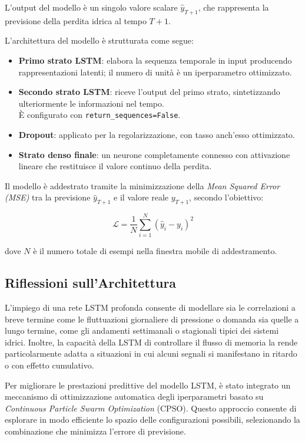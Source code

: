 \documentclass{article}
\begin{document}
L'output del modello è un singolo valore scalare $\hat{y}_{T+1}$, che rappresenta la previsione della perdita idrica al tempo $T+1$.

L’architettura del modello è strutturata come segue:

\begin{itemize}
    \item \textbf{Primo strato LSTM}: elabora la sequenza temporale in input producendo rappresentazioni latenti; il numero di unità è un iperparametro ottimizzato.
    \item \textbf{Secondo strato LSTM}: riceve l'output del primo strato, sintetizzando ulteriormente le informazioni nel tempo. \\È configurato con \verb|return_sequences=False|.
    \item \textbf{Dropout}: applicato per la regolarizzazione, con tasso anch'esso ottimizzato.
    \item \textbf{Strato denso finale}: un neurone completamente connesso con attivazione lineare che restituisce il valore continuo della perdita.
\end{itemize}

Il modello è addestrato tramite la minimizzazione della \textit{Mean Squared Error (MSE)} tra la previsione $\hat{y}_{T+1}$ e il valore reale $y_{T+1}$, secondo l’obiettivo:

\begin{equation}
\mathcal{L} = \frac{1}{N} \sum_{i=1}^N \left( \hat{y}_{i} - y_{i} \right)^2
\end{equation}

dove $N$ è il numero totale di esempi nella finestra mobile di addestramento.

\subsection{Riflessioni sull’Architettura}

L’impiego di una rete LSTM profonda consente di modellare sia le correlazioni a breve termine come le fluttuazioni giornaliere di pressione o domanda sia quelle a lungo termine, come gli andamenti settimanali o stagionali tipici dei sistemi idrici. Inoltre, la capacità della LSTM di controllare il flusso di memoria la rende particolarmente adatta a situazioni in cui alcuni segnali si manifestano in ritardo o con effetto cumulativo.

Per migliorare le prestazioni predittive del modello LSTM, è stato integrato un meccanismo di ottimizzazione automatica degli iperparametri basato su \textit{Continuous Particle Swarm Optimization} (CPSO). Questo approccio consente di esplorare in modo efficiente lo spazio delle configurazioni possibili, selezionando la combinazione che minimizza l'errore di previsione.
\end{document}
